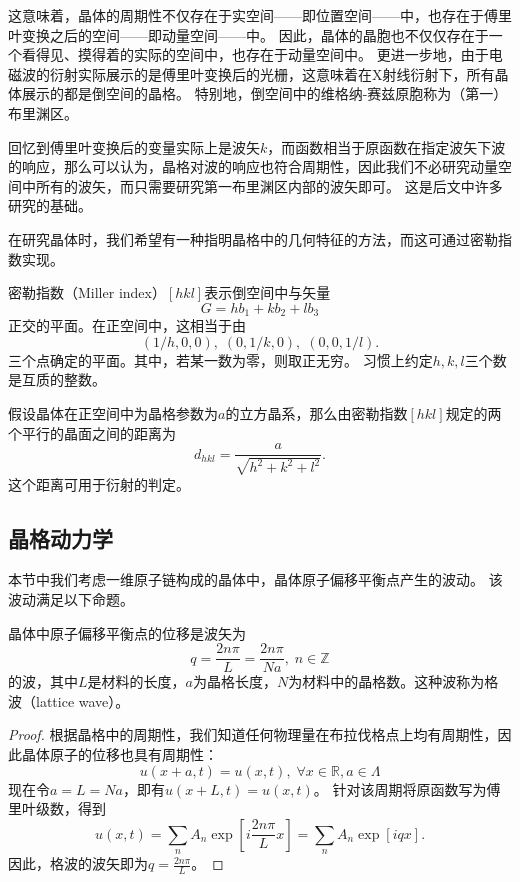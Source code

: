 这意味着，晶体的周期性不仅存在于实空间——即位置空间——中，也存在于傅里叶变换之后的空间——即动量空间——中。
因此，晶体的晶胞也不仅仅存在于一个看得见、摸得着的实际的空间中，也存在于动量空间中。
更进一步地，由于电磁波的衍射实际展示的是傅里叶变换后的光栅，这意味着在X射线衍射下，所有晶体展示的都是倒空间的晶格。
特别地，倒空间中的维格纳-赛兹原胞称为（第一）布里渊区。

回忆到傅里叶变换后的变量实际上是波矢$k$，而函数相当于原函数在指定波矢下波的响应，那么可以认为，晶格对波的响应也符合周期性，因此我们不必研究动量空间中所有的波矢，而只需要研究第一布里渊区内部的波矢即可。
这是后文中许多研究的基础。

在研究晶体时，我们希望有一种指明晶格中的几何特征的方法，而这可通过密勒指数实现。

\begin{definition}
    密勒指数（Miller index）$[hkl]$表示倒空间中与矢量
    \begin{equation}
        G = h b_1 + k b_2 + l b_3
    \end{equation}
    正交的平面。在正空间中，这相当于由
    \begin{equation}
        (1/h, 0, 0), \; (0, 1/k, 0), \; (0, 0, 1/l).
    \end{equation}
    三个点确定的平面。其中，若某一数为零，则取正无穷。
    习惯上约定$h,k,l$三个数是互质的整数。
\end{definition}

假设晶体在正空间中为晶格参数为$a$的立方晶系，那么由密勒指数$[hkl]$规定的两个平行的晶面之间的距离为
\begin{equation}
    d_{hkl} = \frac{a}{\sqrt{h^2 + k^2 + l^2}}.
\end{equation}
这个距离可用于衍射的判定。

\subsection{晶格动力学}
本节中我们考虑一维原子链构成的晶体中，晶体原子偏移平衡点产生的波动。
该波动满足以下命题。
\begin{proposition}
    晶体中原子偏移平衡点的位移是波矢为
    \begin{equation}q = \frac{2n\pi}{L} = \frac{2n\pi}{Na}, \; n \in \mathbb Z\end{equation}
    的波，其中$L$是材料的长度，$a$为晶格长度，$N$为材料中的晶格数。这种波称为格波（lattice wave）。
\end{proposition}

\begin{proof}
    根据晶格中的周期性，我们知道任何物理量在布拉伐格点上均有周期性，因此晶体原子的位移也具有周期性：
    \begin{equation}
        u(x + a, t) = u(x, t), \; \forall x \in \mathbb R, a \in \Lambda
    \end{equation}
    现在令$a = L = Na$，即有$u(x + L, t) = u(x, t)$。
    针对该周期将原函数写为傅里叶级数，得到
    \begin{equation}
        u(x, t) = \sum_{n} A_n \exp[i \frac{2n\pi}{L} x] = \sum_{n} A_n \exp[i q x].
    \end{equation}
    因此，格波的波矢即为$q = \frac{2n\pi}{L}$。
\end{proof}

